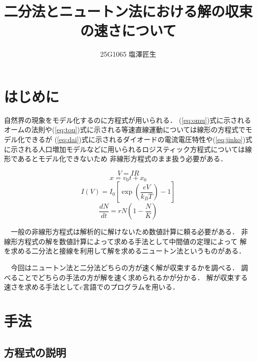 \documentclass[uplatex]{jsarticle}
\begin{document}
\title{二分法とニュートン法における解の収束の速さについて}
\author{25G1065 塩澤匠生}

\maketitle


\section{はじめに}
自然界の現象をモデル化するのに方程式が用いられる．
(\ref{eq:omu})式に示されるオームの法則\cite{omu}や(\ref{eq:tou})式に示される等速直線運動\cite{toutyo}については線形の方程式でモデル化できるが
(\ref{eq:dai})式に示されるダイオードの電流電圧特性\cite{daio}や(\ref{eq:jinko})式に示される人口増加モデルなどに用いられるロジスティック方程式\cite{jinko}については線形であるとモデル化できないため
非線形方程式のまま扱う必要がある．

\begin{equation}
V = IR\label{eq:omu}
\end{equation}
\begin{equation}
x = v_0t + x_0\label{eq:tou}
\end{equation}
\begin{equation}
I(V) = I_0 \left[ \exp\left(\frac{eV}{k_B T}\right) - 1 \right]\label{eq:dai}
\end{equation}
\begin{equation}
\frac{dN}{dt} = rN \left(1 - \frac{N}{K}\right)\label{eq:jinko}
\end{equation}


　一般の非線形方程式は解析的に解けないため数値計算に頼る必要がある．
非線形方程式の解を数値計算によって求める手法として中間値の定理によって
解を求める二分法\cite{waseda}と接線を利用して解を求めるニュートン法\cite{waseda}というものがある．

　今回はニュートン法と二分法どちらの方が速く解が収束するかを調べる．
調べることでどちらの手法の方が解を速く求められるかが分かる．
解が収束する速さを求める手法としてc言語でのプログラムを用いる．
\section{手法}

\subsection{方程式の説明}
\end{document}
